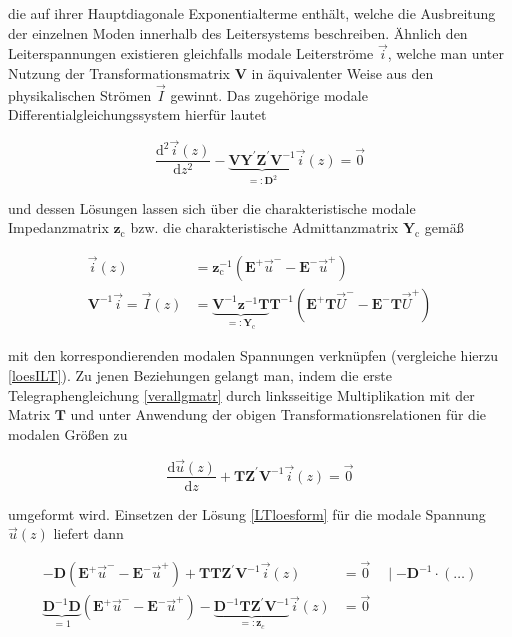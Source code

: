 die auf ihrer Hauptdiagonale Exponentialterme enthält, welche die Ausbreitung der einzelnen Moden innerhalb des Leitersystems beschreiben. Ähnlich den Leiterspannungen existieren gleichfalls modale Leiterströme $\vec{i}$, welche man unter Nutzung der Transformationsmatrix $\mathbf{V}$ in äquivalenter Weise aus den physikalischen Strömen $\vec{I}$ gewinnt. Das zugehörige modale Differentialgleichungssystem hierfür lautet


\begin{equation}
	\frac{\mathrm{d}^{2} \vec{i}(z)}{\mathrm{d} z^{2}}-\underbrace{\mathbf{V} \mathbf{Y}^{\prime} \mathbf{Z}^{\prime} \mathbf{V}^{-1}}_{=: \mathbf{D}^{2}} \vec{i}(z)=\overrightarrow{0} 
\end{equation}


und dessen Lösungen lassen sich über die charakteristische modale Impedanzmatrix $\mathbf{z}_{\mathrm{c}}$ bzw. die charakteristische Admittanzmatrix $\mathbf{Y}_{\mathrm{c}}$ gemäß


\begin{align}
	\vec{i}(z) & =\mathbf{z}_{\mathrm{c}}^{-1}\left(\mathbf{E}^{+} \vec{u}^{-}-\mathbf{E}^{-} \vec{u}^{+}\right) \label{loesiform} \\
	\mathbf{V}^{-1} \vec{i}=\vec{I}(z) & =\underbrace{\mathbf{V}^{-1} \mathbf{z}^{-1} \mathbf{T}}_{=: \mathbf{Y}_{\mathrm{c}}} \mathbf{T}^{-1}\left(\mathbf{E}^{+} \mathbf{T} \vec{U}^{-}-\mathbf{E}^{-} \mathbf{T} \vec{U}^{+}\right) \label{loesiform2}
\end{align}


mit den korrespondierenden modalen Spannungen verknüpfen (vergleiche hierzu \ref{loesILT}). Zu jenen Beziehungen gelangt man, indem die erste Telegraphengleichung \ref{verallgmatr} durch linksseitige Multiplikation mit der Matrix $\mathbf{T}$ und unter Anwendung der obigen Transformationsrelationen für die modalen Größen zu


\begin{equation}
	\frac{\mathrm{d} \vec{u}(z)}{\mathrm{d} z}+\mathbf{T Z}^{\prime} \mathbf{V}^{-1} \vec{i}(z)=\overrightarrow{0} 
\end{equation}


umgeformt wird. Einsetzen der Lösung \ref{LTloesform} für die modale Spannung $\vec{u}(z)$ liefert dann


\begin{align}
	-\mathbf{D}\left(\mathbf{E}^{+} \vec{u}^{-}-\mathbf{E}^{-} \vec{u}^{+}\right)+\mathbf{T} \mathbf{T Z}^{\prime} \mathbf{V}^{-1} \vec{i}(z) & =\overrightarrow{0} \quad \mid-\mathbf{D}^{-1} \cdot(\ldots)  \\
	\underbrace{\mathbf{D}^{-1} \mathbf{D}}_{=1}\left(\mathbf{E}^{+} \vec{u}^{-}-\mathbf{E}^{-} \vec{u}^{+}\right)-\underbrace{\mathbf{D}^{-1} \mathbf{T} \mathbf{Z}^{\prime} \mathbf{V}^{-1}}_{=: \mathbf{z}_{c}} \vec{i}(z) & =\overrightarrow{0} 
\end{align}


